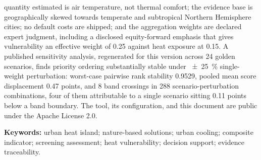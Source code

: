 quantity estimated is air temperature, not thermal comfort; the evidence base
is geographically skewed towards temperate and subtropical Northern Hemisphere
cities; no default costs are shipped; and the aggregation weights are declared
expert judgment, including a disclosed equity-forward emphasis that gives
vulnerability an effective weight of \num{0.25} against heat exposure at
\num{0.15}. A published sensitivity analysis, regenerated for this version
across \num{24} golden scenarios, finds priority ordering substantially stable
under \SI{\pm 25}{\percent} single-weight perturbation: worst-case pairwise
rank stability \num[group-digits=none]{0.9529}, pooled mean score displacement \num{0.47} points,
and \num{8} band crossings in \num{288} scenario-perturbation combinations,
four of them attributable to a single scenario sitting \num{0.11} points below
a band boundary. The tool, its configuration, and this document are public
under the Apache License 2.0.

\vspace{6mm}
\noindent\textbf{Keywords:} urban heat island; nature-based solutions; urban
cooling; composite indicator; screening assessment; heat vulnerability;
decision support; evidence traceability.
